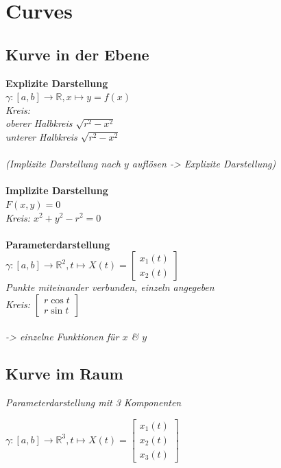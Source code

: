 \section{Curves}

\subsection{Kurve in der Ebene}

\textbf{Explizite Darstellung} \\
$\gamma : [a,b] \rightarrow \mathbb{R} , x \mapsto y = f(x)$ \\
\textit{Kreis: \\oberer Halbkreis $\sqrt{r^2 - x^2}$ \\ unterer Halbkreis $\sqrt{r^2 - x^2}$} \\
\\
\textit{(Implizite Darstellung nach $y$ auflösen -> Explizite Darstellung)}\\
\\
\textbf{Implizite Darstellung} \\
$F(x,y) = 0$ \\
\textit{Kreis: $x^2 + y^2 - r^2 = 0$} \\
\\
\textbf{Parameterdarstellung} \\
$\gamma : [a,b] \rightarrow \mathbb{R}^2,t \mapsto X(t) = \begin{bmatrix} x_1(t) \\ x_2(t) \end{bmatrix}$ \\
\textit{Punkte miteinander verbunden, einzeln angegeben} \\
\textit{Kreis: $\begin{bmatrix} r \cos t \\ r \sin t \end{bmatrix}$}\\
\\
\textit{-> einzelne Funktionen für $x$ \& $y$}\\

\subsection{Kurve im Raum}
\textit{Parameterdarstellung mit 3 Komponenten}

$\gamma : [a,b] \rightarrow \mathbb{R}^3,t \mapsto X(t) = 
\begin{bmatrix}
    x_1(t) \\
    x_2(t) \\
    x_3(t)
\end{bmatrix}$

